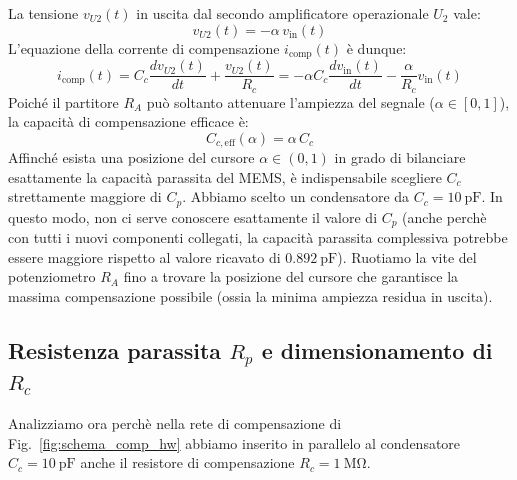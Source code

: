 \documentclass[11pt,a4paper]{article}
\begin{document}
\noindent La tensione $v_{U2}(t)$ in uscita dal secondo amplificatore operazionale $U_2$ vale:
\begin{equation}
    \label{eq:vU2_definizione}
    v_{U2}(t) = -\alpha \, v_{\text{in}}(t)
\end{equation}
L'equazione della corrente di compensazione $i_{\text{comp}}(t)$ è dunque:
\begin{equation}
    \label{eq:icomp_da_vU2}
    i_{\text{comp}}(t) = C_c \frac{dv_{U2}(t)}{dt} + \frac{v_{U2}(t)}{R_c} = -\alpha C_c \frac{dv_{\text{in}}(t)}{dt} - \frac{\alpha}{R_c} v_{\text{in}}(t)
\end{equation}
Poiché il partitore $R_A$ può soltanto attenuare l'ampiezza del segnale ($\alpha \in [0, 1]$), la capacità di compensazione efficace è:
\begin{equation}
    C_{c,\text{eff}}(\alpha) = \alpha \, C_c
\end{equation}
Affinché esista una posizione del cursore $\alpha \in (0, 1)$ in grado di bilanciare esattamente la capacità parassita del MEMS, è indispensabile scegliere $C_c$ strettamente maggiore di $C_p$. Abbiamo scelto un condensatore da $C_c = \SI{10}{\pico\farad}$. In questo modo, non ci serve conoscere esattamente il valore di $C_p$ (anche perchè con tutti i nuovi componenti collegati, la capacità parassita complessiva potrebbe essere maggiore rispetto al valore ricavato di $\SI{0.892}{\pico\farad}$). Ruotiamo la vite del potenziometro $R_A$ fino a trovare la posizione del cursore che garantisce la massima compensazione possibile (ossia la minima ampiezza residua in uscita).

\subsection{Resistenza parassita \texorpdfstring{$R_p$}{Rp} e dimensionamento di \texorpdfstring{$R_c$}{Rc}}
\label{subsec:ruolo_rp_scope}

Analizziamo ora perchè nella rete di compensazione di Fig.~\ref{fig:schema_comp_hw} abbiamo inserito in parallelo al condensatore $C_c = \SI{10}{\pico\farad}$ anche il resistore di compensazione $R_c = \SI{1}{\mega\ohm}$.

\vspace{0.3cm}
\end{document}

